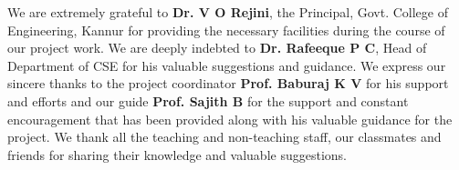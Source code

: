 We are extremely grateful to \textbf{Dr. V O Rejini}, the Principal, Govt. College
of Engineering, Kannur for providing the necessary facilities during the course
of our project work. We are deeply indebted to \textbf{Dr. Rafeeque P C}, Head
of Department of CSE for his valuable suggestions and guidance. We express
our sincere thanks to the project coordinator \textbf{Prof. Baburaj K V} for his support
and efforts and our guide \textbf{Prof. Sajith B} for the support and constant encouragement that has been provided
along with his valuable guidance for the project. We thank all the teaching and
non-teaching staff, our classmates and friends for sharing their knowledge and
valuable suggestions.